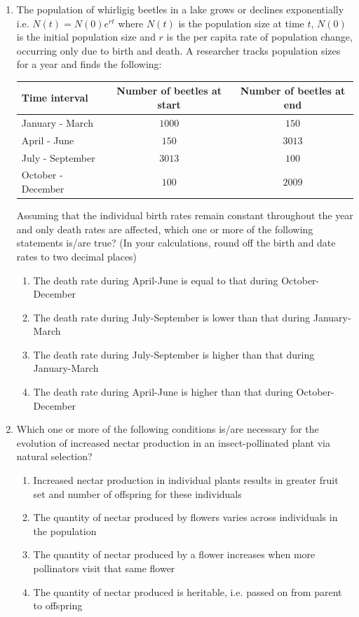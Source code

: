 \documentclass[journal]{IEEEtran}
\begin{document}
\begin{enumerate}
 
    \item The population of whirligig beetles in a lake grows or declines exponentially i.e. $ N(t) = N(0)e^{rt} $ where $N(t)$ is the population size at time $t$, $N(0)$ is the initial population size and $r$ is the per capita rate of population change, occurring only due to birth and death.
A researcher tracks population sizes for a year and finds the following:
    \begin{center}
    \begin{tabular}{|l|c|c|}
    \hline
    \textbf{Time interval} & \textbf{Number of beetles at start} & \textbf{Number of beetles at end} \\ \hline
    January - March & $1000$ & $150$ \\
    April - June & $150$ & $3013$ \\
    July - September & $3013$ & $100$ \\
    October - December & $100$ & $2009$ \\ \hline
    \end{tabular}
    \end{center}
    Assuming 
that the individual birth rates remain constant throughout the year and only death rates are affected, which one or more of the following statements is/are true?
(In your calculations, round off the birth and date rates to two decimal places)
    \begin{enumerate}
        \item The death rate during April-June is equal to that during October-December
        \item The death rate during July-September is lower than that during January-March
        \item The death rate during July-September is higher than that during January-March
        \item The death rate during April-June is higher than that during October-December
    \end{enumerate}
   
 
    \item Which one or more of the following conditions is/are necessary for the evolution of increased nectar production in an insect-pollinated plant via natural selection?
\begin{enumerate}
        \item Increased nectar production in individual plants results in greater fruit set and number of offspring for these individuals
        \item The quantity of nectar produced by flowers varies across individuals in the population
        \item The quantity of nectar produced by a flower increases when more pollinators visit that same flower
        \item The quantity of nectar produced is heritable, i.e. passed on from parent to offspring
    \end{enumerate}


\end{enumerate}
\end{document}

